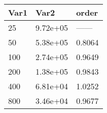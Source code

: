 \begin{tabular}{lll}
Var1 & Var2 & order \\ 
\hline 
25 & 9.72e+05 & ------ \\ 
50 & 5.38e+05 & 0.8064 \\ 
100 & 2.74e+05 & 0.9649 \\ 
200 & 1.38e+05 & 0.9843 \\ 
400 & 6.81e+04 & 1.0252 \\ 
800 & 3.46e+04 & 0.9677 \\ 
\hline 
\end{tabular}